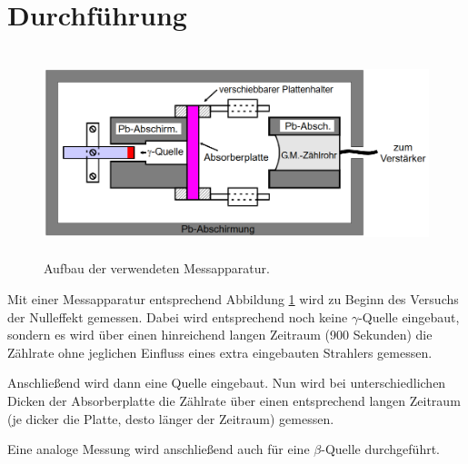 \section{Durchführung}
\label{sec:Durchführung}
\begin{figure}[H]
  \centering
  \includegraphics[height=6cm]{Aufbau.PNG}
  \caption{Aufbau der verwendeten Messapparatur. \cite{sample}}
  \label{fig:aufbau}
\end{figure}

Mit einer Messapparatur entsprechend Abbildung \ref{fig:aufbau} wird zu Beginn des
Versuchs der Nulleffekt gemessen. Dabei wird entsprechend noch keine $\gamma$-Quelle eingebaut,
sondern es wird über einen hinreichend langen Zeitraum (900 Sekunden) die Zählrate ohne
jeglichen Einfluss eines extra eingebauten Strahlers gemessen.

Anschließend wird dann eine Quelle eingebaut. Nun wird bei unterschiedlichen Dicken
der Absorberplatte die Zählrate über einen entsprechend langen Zeitraum (je dicker die
Platte, desto länger der Zeitraum) gemessen.

Eine analoge Messung wird anschließend auch für eine $\beta$-Quelle durchgeführt.
